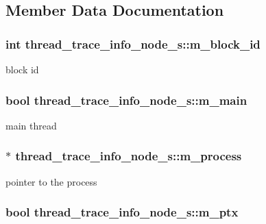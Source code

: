 \subsection{Member Data Documentation}
\hypertarget{structthread__trace__info__node__s_a8502fed3f5ce2865bf0b517bdbd5ef79}{
\subsubsection[{m\_\-block\_\-id}]{\setlength{\rightskip}{0pt plus 5cm}int {\bf thread\_\-trace\_\-info\_\-node\_\-s::m\_\-block\_\-id}}}
\label{structthread__trace__info__node__s_a8502fed3f5ce2865bf0b517bdbd5ef79}
block id \hypertarget{structthread__trace__info__node__s_a241862d3ffe48c4ab7c85456244cf7dc}{
\subsubsection[{m\_\-main}]{\setlength{\rightskip}{0pt plus 5cm}bool {\bf thread\_\-trace\_\-info\_\-node\_\-s::m\_\-main}}}
\label{structthread__trace__info__node__s_a241862d3ffe48c4ab7c85456244cf7dc}
main thread \hypertarget{structthread__trace__info__node__s_a1b4fbce5655a7094c48f8dd7be4f9dd4}{
\subsubsection[{m\_\-process}]{$\ast$ {\bf thread\_\-trace\_\-info\_\-node\_\-s::m\_\-process}}}
\label{structthread__trace__info__node__s_a1b4fbce5655a7094c48f8dd7be4f9dd4}
pointer to the process \hypertarget{structthread__trace__info__node__s_a0355328ae8596c5029df7ac4a2c0eca7}{
\subsubsection[{m\_\-ptx}]{\setlength{\rightskip}{0pt plus 5cm}bool {\bf thread\_\-trace\_\-info\_\-node\_\-s::m\_\-ptx}}}
